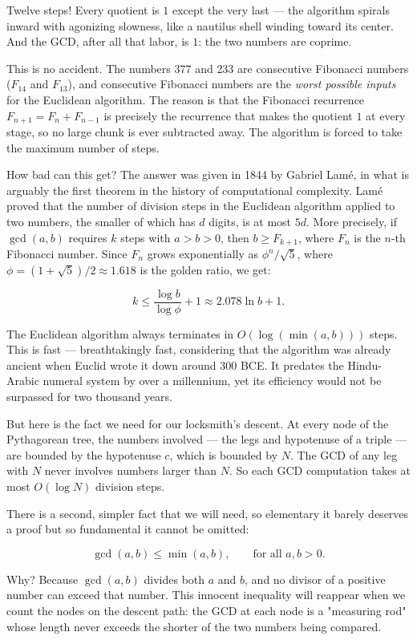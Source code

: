 \documentclass[11pt,twoside,openright]{book}
\theoremstyle{definition}
\theoremstyle{remark}
\begin{document}
Twelve steps! Every quotient is $1$ except the very last --- the algorithm spirals inward with agonizing slowness, like a nautilus shell winding toward its center. And the GCD, after all that labor, is $1$: the two numbers are coprime.

This is no accident. The numbers $377$ and $233$ are consecutive Fibonacci numbers ($F_{14}$ and $F_{13}$), and consecutive Fibonacci numbers are the \textit{worst possible inputs} for the Euclidean algorithm. The reason is that the Fibonacci recurrence $F_{n+1} = F_n + F_{n-1}$ is precisely the recurrence that makes the quotient $1$ at every stage, so no large chunk is ever subtracted away. The algorithm is forced to take the maximum number of steps.

How bad can this get? The answer was given in 1844 by Gabriel Lam\'e, in what is arguably the first theorem in the history of computational complexity. Lam\'e proved that the number of division steps in the Euclidean algorithm applied to two numbers, the smaller of which has $d$ digits, is at most $5d$. More precisely, if $\gcd(a, b)$ requires $k$ steps with $a > b > 0$, then $b \ge F_{k+1}$, where $F_n$ is the $n$-th Fibonacci number. Since $F_n$ grows exponentially as $\phi^n / \sqrt{5}$, where $\phi = (1 + \sqrt{5})/2 \approx 1.618$ is the golden ratio, we get:

\[k \le \frac{\log b}{\log \phi} + 1 \approx 2.078 \ln b + 1.\]

The Euclidean algorithm always terminates in $O(\log(\min(a, b)))$ steps. This is fast --- breathtakingly fast, considering that the algorithm was already ancient when Euclid wrote it down around 300 BCE. It predates the Hindu-Arabic numeral system by over a millennium, yet its efficiency would not be surpassed for two thousand years.

But here is the fact we need for our locksmith's descent. At every node of the Pythagorean tree, the numbers involved --- the legs and hypotenuse of a triple --- are bounded by the hypotenuse $c$, which is bounded by $N$. The GCD of any leg with $N$ never involves numbers larger than $N$. So each GCD computation takes at most $O(\log N)$ division steps.

There is a second, simpler fact that we will need, so elementary it barely deserves a proof but so fundamental it cannot be omitted:

\[\gcd(a, b) \le \min(a, b), \qquad \text{for all } a, b > 0.\]

Why? Because $\gcd(a, b)$ divides both $a$ and $b$, and no divisor of a positive number can exceed that number. This innocent inequality will reappear when we count the nodes on the descent path: the GCD at each node is a "measuring rod" whose length never exceeds the shorter of the two numbers being compared.
\end{document}
